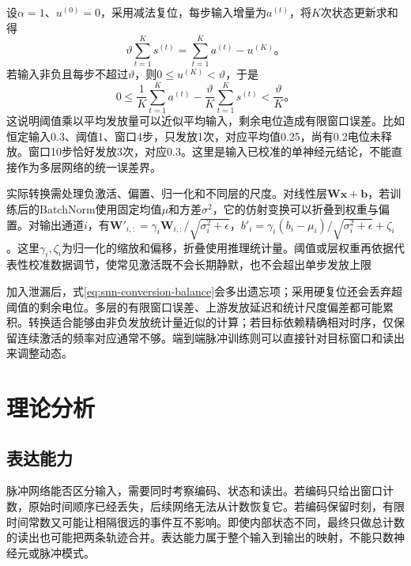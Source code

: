 设$\alpha=1$、$u^{(0)}=0$，采用减法复位，每步输入增量为$a^{(t)}$，将$K$次状态更新求和得
\begin{equation}
  \vartheta\sum_{t=1}^{K}s^{(t)}
  =\sum_{t=1}^{K}a^{(t)}-u^{(K)}\text{。}
  \label{eq:snn-conversion-balance}
\end{equation}
若输入非负且每步不超过$\vartheta$，则$0\leq u^{(K)}<\vartheta$，于是
\begin{equation}
  0\leq\frac1K\sum_{t=1}^{K}a^{(t)}
       -\frac{\vartheta}{K}\sum_{t=1}^{K}s^{(t)}
  <\frac{\vartheta}{K}\text{。}
  \label{eq:snn-conversion-error}
\end{equation}
这说明阈值乘以平均发放量可以近似平均输入，剩余电位造成有限窗口误差。比如恒定输入0.3、阈值1、窗口4步，只发放1次，对应平均值0.25，尚有0.2电位未释放。窗口10步恰好发放3次，对应0.3。这里是输入已校准的单神经元结论，不能直接作为多层网络的统一误差界。

实际转换需处理负激活、偏置、归一化和不同层的尺度。对线性层$\bm W\bm x+\bm b$，若训练后的BatchNorm使用固定均值$\mu$和方差$\sigma^2$，它的仿射变换可以折叠到权重与偏置。对输出通道$i$，有$\bm W'_{i,:}=\gamma_i\bm W_{i,:}/\sqrt{\sigma_i^2+\epsilon}$，$b'_i=\gamma_i(b_i-\mu_i)/\sqrt{\sigma_i^2+\epsilon}+\zeta_i$。这里$\gamma_i,\zeta_i$为归一化的缩放和偏移，折叠使用推理统计量。阈值或层权重再依据代表性校准数据调节，使常见激活既不会长期静默，也不会超出单步发放上限

加入泄漏后，式\eqref{eq:snn-conversion-balance}会多出遗忘项；采用硬复位还会丢弃超阈值的剩余电位。多层的有限窗口误差、上游发放延迟和统计尺度偏差都可能累积。转换适合能够由非负发放统计量近似的计算；若目标依赖精确相对时序，仅保留连续激活的频率对应通常不够。端到端脉冲训练则可以直接针对目标窗口和读出来调整动态。

\section{理论分析}
\label{sec:snn-analysis}

\subsection{表达能力}
\label{sec:snn-temporal-stability}

脉冲网络能否区分输入，需要同时考察编码、状态和读出。若编码只给出窗口计数，原始时间顺序已经丢失，后续网络无法从计数恢复它。若编码保留时刻，有限时间常数又可能让相隔很远的事件互不影响。即使内部状态不同，最终只做总计数的读出也可能把两条轨迹合并。表达能力属于整个输入到输出的映射，不能只数神经元或脉冲模式。


